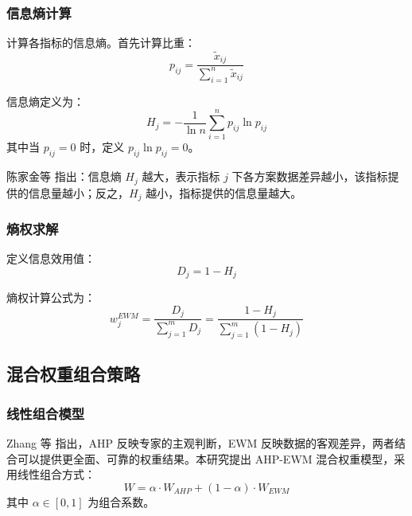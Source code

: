 \subsubsection{信息熵计算}

计算各指标的信息熵。首先计算比重\cite{wang2019comprehensive}：
\begin{equation}
    p_{ij} = \frac{\tilde{x}_{ij}}{\sum_{i=1}^{n} \tilde{x}_{ij}}
    \label{eq:pij}
\end{equation}

信息熵定义为：
\begin{equation}
    H_j = -\frac{1}{\ln n} \sum_{i=1}^{n} p_{ij} \ln p_{ij}
    \label{eq:entropy}
\end{equation}
其中当 $p_{ij} = 0$ 时，定义 $p_{ij} \ln p_{ij} = 0$。

陈家金等\cite{chen2016fujian} 指出：信息熵 $H_j$ 越大，表示指标 $j$ 下各方案数据差异越小，该指标提供的信息量越小；反之，$H_j$ 越小，指标提供的信息量越大。

\subsubsection{熵权求解}

定义信息效用值\cite{wang2019comprehensive}：
\begin{equation}
    D_j = 1 - H_j
    \label{eq:dj}
\end{equation}

熵权计算公式为\cite{shang2009chengshi}：
\begin{equation}
    w_j^{EWM} = \frac{D_j}{\sum_{j=1}^{m} D_j} = \frac{1 - H_j}{\sum_{j=1}^{m} (1 - H_j)}
    \label{eq:ewm_weight}
\end{equation}

\subsection{混合权重组合策略}
\label{subsec:hybrid}

\subsubsection{线性组合模型}

Zhang 等\cite{zhang2023risk} 指出，AHP 反映专家的主观判断，EWM 反映数据的客观差异，两者结合可以提供更全面、可靠的权重结果。本研究提出 AHP-EWM 混合权重模型，采用线性组合方式：
\begin{equation}
    W = \alpha \cdot W_{AHP} + (1 - \alpha) \cdot W_{EWM}
    \label{eq:hybrid}
\end{equation}
其中 $\alpha \in [0, 1]$ 为组合系数。


